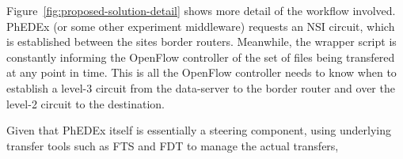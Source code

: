 Figure~\ref{fig:proposed-solution-detail} shows more detail of the workflow involved. PhEDEx (or some other experiment middleware) requests an NSI circuit, which is established between the sites border routers. Meanwhile, the wrapper script is constantly informing the OpenFlow controller of the set of files being transfered at any point in time. This is all the OpenFlow controller needs to know when to establish a level-3 circuit from the data-server to the border router and over the level-2 circuit to the destination.




















Given that PhEDEx itself is essentially a steering component, using underlying transfer tools such as FTS and FDT to manage the actual transfers, 